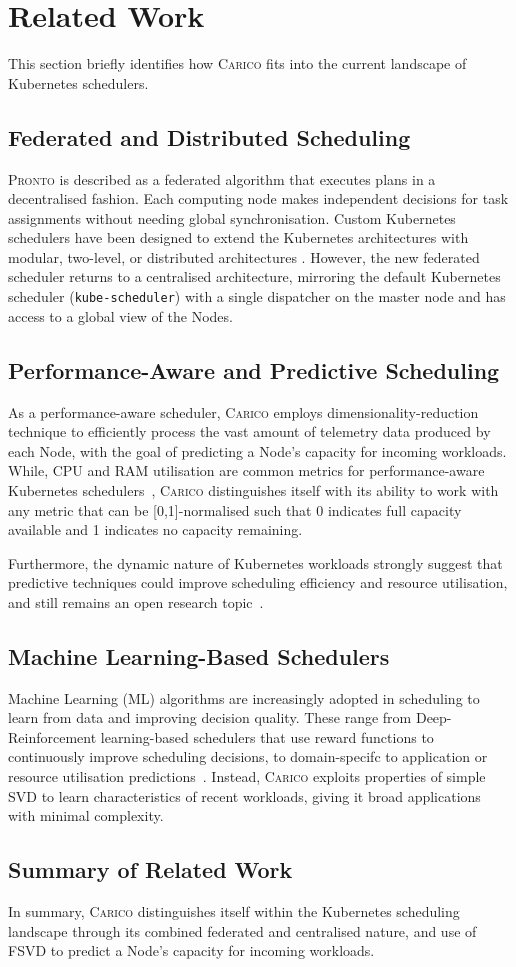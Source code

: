 \section{Related Work}
This section briefly identifies how \textsc{Carico} fits into the current
landscape of Kubernetes schedulers.

\subsection{Federated and Distributed Scheduling}
\textsc{Pronto} is described as a federated algorithm that executes plans in a
decentralised fashion. Each computing node makes independent decisions for task
assignments without needing global synchronisation. Custom Kubernetes schedulers
have been designed to extend the Kubernetes architectures with modular,
two-level, or distributed architectures \cite{11, 23,67,137}. However, the new
federated scheduler returns to a centralised architecture, mirroring the default
Kubernetes scheduler (\texttt{kube-scheduler}) with a single dispatcher on the
master node and has access to a global view of the Nodes.

\subsection{Performance-Aware and Predictive Scheduling}
As a performance-aware scheduler, \textsc{Carico} employs
dimensionality-reduction technique to efficiently process the vast amount of
telemetry data produced by each Node, with the goal of predicting a Node's
capacity for incoming workloads. While, CPU and RAM utilisation are common
metrics for performance-aware Kubernetes schedulers~\cite{bao2019deep,
beltre2019kubesphere, bestari2020dynamic, carvalho2021qoe, toka2021ultra},
\textsc{Carico} distinguishes itself with its ability to work with any metric
that can be [0,1]-normalised such that 0 indicates full capacity available and 1
indicates no capacity remaining.

Furthermore, the dynamic nature of Kubernetes workloads strongly suggest that
predictive techniques could improve scheduling efficiency and resource
utilisation, and still remains an open research
topic~\cite{carrion2022kubernetes}.

\subsection{Machine Learning-Based Schedulers}
Machine Learning (ML) algorithms  are increasingly adopted in scheduling to
learn from data and improving decision quality. These range from
Deep-Reinforcement learning-based schedulers \cite{bao2019deep, huang2020rlsk,
peng2021dl2, han2021tailored} that use reward functions to continuously improve
scheduling decisions, to domain-specifc to application or resource utilisation
predictions~\cite{yang2019design, carvalho2021qoe, harichane2020proposal}.
Instead, \textsc{Carico} exploits properties of simple SVD to learn
characteristics of recent workloads, giving it broad applications with minimal
complexity.

\subsection{Summary of Related Work}
In summary, \textsc{Carico} distinguishes itself within the Kubernetes
scheduling landscape through its combined federated and centralised nature, and
use of FSVD to predict a Node's capacity for incoming workloads.
